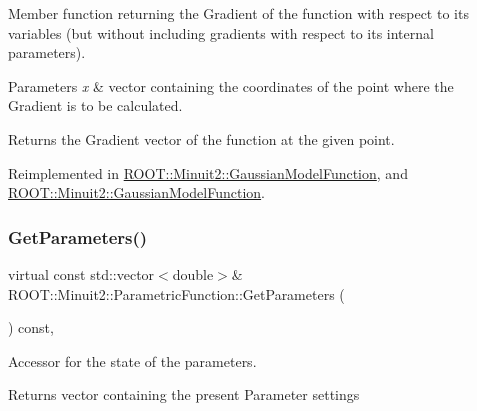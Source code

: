 Member function returning the Gradient of the function with respect to its variables (but without including gradients with respect to its internal parameters).


\begin{DoxyParams}{Parameters}
{\em x} & vector containing the coordinates of the point where the Gradient is to be calculated.\\
\hline
\end{DoxyParams}
\begin{DoxyReturn}{Returns}
the Gradient vector of the function at the given point. 
\end{DoxyReturn}


Reimplemented in \mbox{\hyperlink{classROOT_1_1Minuit2_1_1GaussianModelFunction_ac81a3c5531a291b8a9c3af533de07195}{R\+O\+O\+T\+::\+Minuit2\+::\+Gaussian\+Model\+Function}}, and \mbox{\hyperlink{classROOT_1_1Minuit2_1_1GaussianModelFunction_ac81a3c5531a291b8a9c3af533de07195}{R\+O\+O\+T\+::\+Minuit2\+::\+Gaussian\+Model\+Function}}.

\mbox{\label{classROOT_1_1Minuit2_1_1ParametricFunction_ac3e70b4d9b0cbe60c529823f6a612a5e}} 
\subsubsection{\texorpdfstring{GetParameters()}{GetParameters()}\hspace{0.1cm}{\footnotesize\ttfamily [1/3]}}
{\footnotesize\ttfamily virtual const std\+::vector$<$double$>$\& R\+O\+O\+T\+::\+Minuit2\+::\+Parametric\+Function\+::\+Get\+Parameters (\begin{DoxyParamCaption}{ }\end{DoxyParamCaption}) const\hspace{0.3cm}{\ttfamily [inline]}, {\ttfamily [virtual]}}

Accessor for the state of the parameters.

\begin{DoxyReturn}{Returns}
vector containing the present Parameter settings 
\end{DoxyReturn}
\mbox{\label{classROOT_1_1Minuit2_1_1ParametricFunction_ac3e70b4d9b0cbe60c529823f6a612a5e}} 
